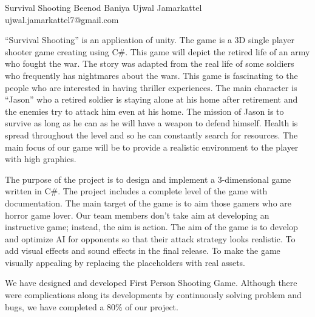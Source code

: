  \begin{conf-abstract}[]
 {Survival Shooting}
 {Beenod Baniya 
 	Ujwal Jamarkattel
 }
{ujwal.jamarkattel7@gmail.com}

“Survival Shooting” is an application of unity. The game is a 3D single player shooter game creating using C\#. This game will depict the retired life of an army who fought the war. The story was adapted from the real life of some soldiers who frequently has nightmares about the wars. This game is fascinating to the people who are interested in having thriller experiences. The main character is “Jason” who a retired soldier is staying alone at his home after retirement and the enemies try to attack him even at his home. The mission of Jason is to survive as long as he can as he will have a weapon to defend himself. Health is spread throughout the level and so he can constantly search for resources. The main focus of our game will be to provide a realistic environment to the player with high graphics.

The purpose of the project is to design and implement a 3-dimensional game written in C\#. The project includes a complete level of the game with documentation. The main target of the game is to aim those gamers who are horror game lover. Our team members don’t take aim at developing an instructive game; instead, the aim is action. The aim of the game is to develop and optimize AI for opponents so that their attack strategy looks realistic. To add visual effects and sound effects in the final release. To make the game visually appealing by replacing the placeholders with real assets.

We have designed and developed First Person Shooting Game. Although there were complications along its developments by continuously solving problem and bugs, we have completed a 80\% of our project. 
 \end{conf-abstract}
